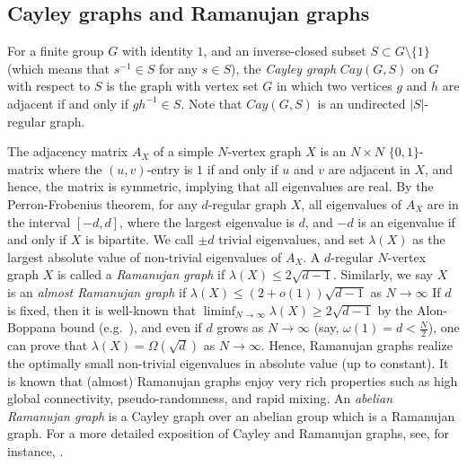 \documentclass{amsart}
\numberwithin{equation}{section}
\begin{document}
\subsection{Cayley graphs and Ramanujan graphs}
For a finite group $G$ with identity $1$, and an inverse-closed subset $S \subset G \setminus \{1\}$ (which means that $s^{-1}\in S$ for any $s \in S$), the {\it Cayley graph} $Cay(G, S)$ on $G$ with respect to $S$ is the graph with vertex set $G$ in which two vertices $g$ and $h$ are adjacent if and only if $gh^{-1} \in S$. 
Note that $Cay(G, S)$ is an undirected $|S|$-regular graph.

The adjacency matrix $A_X$ of a simple $N$-vertex graph $X$ is an $N\times N$ $\{0,1\}$-matrix where the $(u,v)$-entry is $1$ if and only if $u$ and $v$ are adjacent in $X$, and hence, the matrix is symmetric, implying that all eigenvalues are real.
By the Perron-Frobenius theorem, for any $d$-regular graph $X$, 
all eigenvalues of $A_X$ are in the interval $[-d, d]$, where the largest eigenvalue is $d$, and $-d$ is an eigenvalue if and only if $X$ is bipartite. 
We call $\pm d$ trivial eigenvalues, and set $\lambda(X)$ as the largest absolute value of non-trivial eigenvalues of $A_X$.
A $d$-regular $N$-vertex graph $X$ is called a {\it Ramanujan graph} if  $\lambda(X) \leq 2\sqrt{d-1}$.
Similarly, we say $X$ is an {\it almost Ramanujan graph} if $\lambda(X) \leq (2+o(1))\sqrt{d-1}$ as $N \to \infty$
If $d$ is fixed, then it is well-known that $\displaystyle \liminf_{N\to \infty}\lambda(X) \geq 2\sqrt{d-1}$ by the Alon-Boppana bound (e.g.~\cite{DSV2003}), and even if $d$ grows as $N \to \infty$ (say, $\omega(1)=d<\frac{N}{2}$),  one can prove that $\lambda(X) = \Omega(\sqrt{d})$ as $N \to \infty$.
Hence, Ramanujan graphs realize the optimally small non-trivial eigenvalues in absolute value (up to constant).
It is known that (almost) Ramanujan graphs enjoy very rich properties such as high global connectivity, pseudo-randomness, and rapid mixing.
An {\it abelian Ramanujan graph} is a Cayley graph over an abelian group which is a Ramanujan graph.
For a more detailed exposition of Cayley and Ramanujan graphs, see, for instance, \cite{DSV2003}. 
\end{document}
